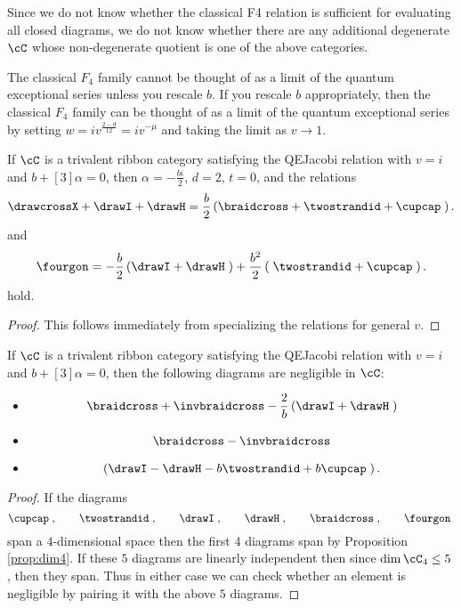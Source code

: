\documentclass[12pt]{amsart}
\begin{document}
Since we do not know whether the classical F4 relation is sufficient for evaluating all closed diagrams, we do not know whether there are any additional degenerate $\cC$ whose non-degenerate quotient is one of the above categories.

\begin{remark}
The classical $F_4$ family cannot be thought of as a limit of the quantum exceptional series unless you rescale $b$.  If you rescale $b$ appropriately, then the classical $F_4$ family can be thought of as a limit of the quantum exceptional series by setting $w = i v^{\frac{2-d}{12}} = i v^{-\mu}$ and taking the limit as $v \rightarrow 1$.
\end{remark}

\begin{lemma}
If $\cC$ is a trivalent ribbon category satisfying the QEJacobi relation with $v=i$ and $b+[3]\alpha = 0$, then $\alpha = -\frac{bi}{2}$, $d = 2$, $t=0$, and the relations
$$\drawcrossX + \drawI + \drawH = \frac{b}{2} \left(\braidcross + \twostrandid + \cupcap \;\right).$$
and 
$$\fourgon = -\frac{b}{2} \left(\drawI + \drawH \;\right) + \frac{b^2}{2} \left(\;\twostrandid + \cupcap \;\right).$$ hold.
\end{lemma}
\begin{proof}
This follows immediately from specializing the relations for general $v$.
\end{proof}

\begin{lemma}
If $\cC$ is a trivalent ribbon category satisfying the QEJacobi relation with $v=i$ and $b+[3]\alpha = 0$, then the following diagrams are negligible in $\cC$:
\begin{itemize}
\item $$\braidcross + \invbraidcross - \frac{2}{b} \left(\drawI + \drawH \;\right)$$
\item $$\braidcross - \invbraidcross$$
\item $$\left(\drawI - \drawH - b \twostrandid + b \cupcap\;\right).$$
\end{itemize}
\end{lemma}
\begin{proof}
If the diagrams
  \[
  \cupcap\;,\qquad\twostrandid\;,
    \qquad\drawI\;,\qquad\drawH\;,\qquad\braidcross\;,\qquad\fourgon\;
   \]
 span a $4$-dimensional space then the first $4$ diagrams span by Proposition \ref{prop:dim4}.  If these $5$ diagrams are linearly independent then since $\dim \cC_4 \leq 5$, then they span.  Thus in either case we can check whether an element is negligible by pairing it with the above $5$ diagrams.
\end{proof}
\end{document}
